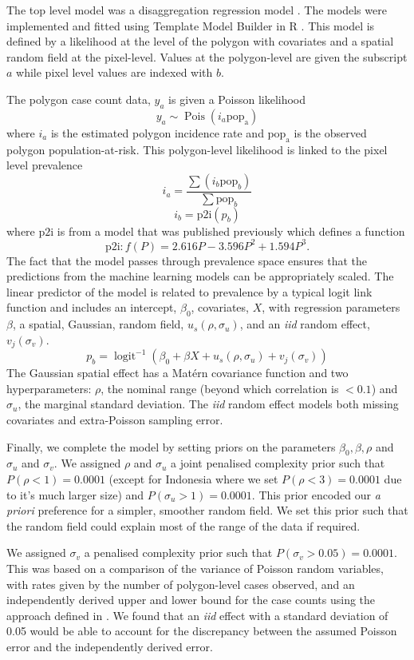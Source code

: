 \documentclass[11pt]{article}
\begin{document}
The top level model was a disaggregation regression model \citep{sturrock2014fine, wilson2017pointless, law2018variational, taylor2017continuous, li2012log}.
The models were implemented and fitted using Template Model Builder \citep{TMB} in R \citep{R}.
This model is defined by a likelihood at the level of the polygon with covariates and a spatial random field at the pixel-level. 
Values at the polygon-level are given the subscript $a$ while pixel level values are indexed with $b$.

The polygon case count data, $y_a$ is given a Poisson likelihood
$$y_a \sim \operatorname{Pois}(i_a\mathrm{pop_a})$$
where $i_a$ is the estimated polygon incidence rate and $\mathrm{pop_a}$ is the observed polygon population-at-risk. 
This polygon-level likelihood is linked to the pixel level prevalence 
$$i_a = \frac{ \sum(i_b \mathrm{pop}_b)}{\sum  \mathrm{pop}_b} $$
$$i_b = \mathrm{p2i}(p_b)$$
where $\mathrm{p2i}$ is from a model that was published previously \citep{cameron2015defining} which defines a function
$$\mathrm{p2i}: f(P) = 2.616P - 3.596P^2 + 1.594P^3.$$
The fact that the model passes through prevalence space ensures that the predictions from the machine learning models can be appropriately scaled.
The linear predictor of the model is related to prevalence by a typical logit link function and includes an intercept, $\beta_0$, covariates, $X$, with regression parameters $\beta$, a spatial, Gaussian, random field, $u_s(\rho, \sigma_u)$, and an \emph{iid} random effect, $v_j(\sigma_v)$.
$$p_b = \operatorname{logit}^{-1}\left(\beta_0 + \beta X  + u_s(\rho, \sigma_u) + v_j(\sigma_v)\right)$$
The Gaussian spatial effect has a Mat\'ern covariance function and two hyperparameters: $\rho$, the nominal range (beyond which correlation is $< 0.1$) and $\sigma_u$, the marginal standard deviation.
The \emph{iid} random effect models both missing covariates and extra-Poisson sampling error.

Finally, we complete the model by setting priors on the parameters $\beta_0, \beta, \rho$ and $\sigma_u$ and $\sigma_v$. 
We assigned $\rho$ and $\sigma_u$ a joint penalised complexity prior \citep{fuglstad2018constructing} such that $P(\rho < 1) = 0.0001$ (except for Indonesia where we set $P(\rho < 3) = 0.0001$ due to it's much larger size) and $P(\sigma_u > 1) = 0.0001$. 
This prior encoded our \emph{a priori} preference for a simpler, smoother random field.
We set this prior such that the random field could explain most of the range of the data if required.

We assigned $\sigma_v$ a penalised complexity prior \citep{simpson2017penalising} such that $P(\sigma_v > 0.05) =  0.0001$. 
This was based on a comparison of the variance of Poisson random variables, with rates given by the number of polygon-level cases observed, and an independently derived upper and lower bound for the case counts using the approach defined in \citep{cibulskis2011worldwide}. 
We found that an \emph{iid} effect with a standard deviation of 0.05 would be able to account for the discrepancy between the assumed Poisson error and the independently derived error.
\end{document}
